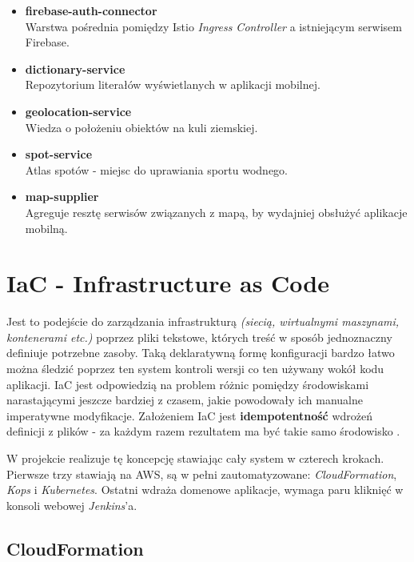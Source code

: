 \begin{itemize}
    \item
    \textbf{firebase-auth-connector}\\ 
    Warstwa pośrednia pomiędzy Istio \emph{Ingress Controller} a istniejącym serwisem Firebase.
    
    \item
    \textbf{dictionary-service}\\ 
    Repozytorium literałów wyświetlanych w aplikacji mobilnej.

    \item
    \textbf{geolocation-service}\\ 
    Wiedza o położeniu obiektów na kuli ziemskiej.

    \item
    \textbf{spot-service}\\ 
    Atlas spotów - miejsc do uprawiania sportu wodnego.

    \item
    \textbf{map-supplier}\\ 
    Agreguje resztę serwisów związanych z mapą, by wydajniej obsłużyć aplikacje mobilną.
\end{itemize} 




\section{IaC - Infrastructure as Code}

Jest to podejście do zarządzania infrastrukturą \emph{(siecią, wirtualnymi maszynami, kontenerami etc.)} poprzez pliki tekstowe, 
których treść w sposób jednoznaczny definiuje potrzebne zasoby. 
Taką deklaratywną formę konfiguracji bardzo łatwo można śledzić poprzez ten system kontroli wersji co ten używany wokół kodu aplikacji.
IaC jest odpowiedzią na problem różnic pomiędzy środowiskami narastającymi jeszcze bardziej z czasem, jakie powodowały ich manualne imperatywne modyfikacje.
Założeniem IaC jest \textbf{idempotentność} wdrożeń definicji z plików - za każdym razem rezultatem ma być takie samo środowisko \cite{iac-ms}.

W projekcie realizuje tę koncepcję stawiając cały system w czterech krokach. 
Pierwsze trzy stawiają  na AWS, są w pełni zautomatyzowane: \emph{CloudFormation}, \emph{Kops} i \emph{Kubernetes}.
Ostatni wdraża domenowe aplikacje, wymaga paru kliknięć w konsoli webowej \emph{Jenkins}'a. 

\subsection{CloudFormation}
\label{iac:cf}

